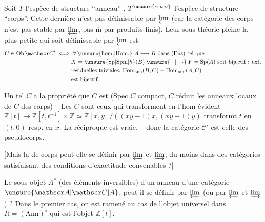  Soit $T$ l'espèce de structure ``anneau'' , $T^{\unsure{\alpha|a|\circ}}$ l'espèce de structure ``corps''. Cette dernière n'est pas définissable par $\varprojlim$ (car la catégorie des corps  n'est pas stable par $\varprojlim$, pas $\overline{\mathrm m}$ par produits finis). Leur sous-théorie pleine  la plus petite qui soit définissable par $\varprojlim$ est 
\[
\begin{aligned}
C\in\mathrm{Ob}\,\mathscr C'\ \Longleftrightarrow{}&
 \ \forall\,\unsure{\mathrm{hom.}|\mathrm{Hom.}}\ A\longrightarrow B\text{ dans }(\mathrm{Ens})\text{ tel que}\\
&X=\unsure{\mathrm{Sp}|\mathrm{Spm}|h}(B)\mathbin{\unsure{-|\to}}Y=\mathrm{Sp}(A)\text{ soit bijectif : ext.}\\
&\text{résiduelles triviales, }\mathrm{Hom}_{\mathrm{ann}}(B,C)\mathbin{-}\mathrm{Hom}_{\mathrm{ann}}(A,C)\\
&\text{est bijectif.}
\end{aligned}
\]

Un tel $C$ a la propriété que $C$ est  (Spec $C$  compact,  $C$ réduit \deleted{$\Longleftrightarrow$} les  anneaux locaux de $C$ des corps) -- Les $C$ sont ceux qui transforment en  l'hom évident $\mathbb Z[t]\longrightarrow\mathbb Z[t,t^{-1}]\times\mathbb Z\simeq\mathbb Z[x,y]/((xy-1)x,(xy-1)y)$ transformt $t$ en $(t,0)$ resp. en $x$. La réciproque est vraie,  -- donc la catégorie  $\mathscr C'$ est celle des pseudocorps.

[Mais la  de corps peut elle se définir par $\varprojlim$ et $\varinjlim$, du moins dans des catégories satisfaisant des conditions d'exactitude convenables ?]

Le sous-objet $A^\ast$ (des éléments inversibles) d'un  anneau d'une catégorie $\unsure{\mathscr A|\mathscr C|A}$, peut-il se définir par $\varprojlim$ (ou par $\varprojlim$ et $\varinjlim$) ? Dans le premier cas, on est ramené au cas de l'objet universel dans $R=(\mathrm{Ann})^\circ$  qui est l'objet $\mathbb Z[t]$.
